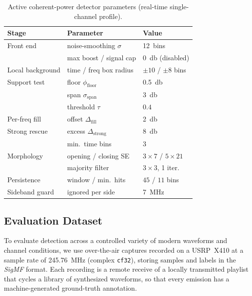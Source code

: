 \begin{table}[t]
\centering
\caption{Active coherent-power detector parameters (real-time single-channel profile).}
\label{tab:params}
\small
\begin{tabular}{@{}lll@{}}
\toprule
Stage & Parameter & Value \\
\midrule
Front end     & noise-smoothing $\sigma$          & \SI{12}{bins} \\
              & max boost / signal cap            & \SI{0}{\decibel} (disabled) \\
Local background & time / freq box radius         & $\pm10$ / $\pm8$ bins \\
Support test  & floor $\phi_{\text{floor}}$       & \SI{0.5}{\decibel} \\
              & span $\sigma_{\text{span}}$       & \SI{3}{\decibel} \\
              & threshold $\tau$                  & $0.4$ \\
Per-freq fill & offset $\Delta_{\text{fill}}$     & \SI{2}{\decibel} \\
Strong rescue & excess $\Delta_{\text{strong}}$   & \SI{8}{\decibel} \\
              & min.\ time bins                   & $3$ \\
Morphology    & opening / closing SE             & $3{\times}7$ / $5{\times}21$ \\
              & majority filter                   & $3{\times}3$, 1 iter. \\
Persistence   & window / min.\ hits              & $45$ / $11$ bins \\
Sideband guard & ignored per side                & \SI{7}{\mega\hertz} \\
\bottomrule
\end{tabular}
\end{table}

\subsection{Evaluation Dataset}
\label{sec:dataset}

To evaluate detection across a controlled variety of modern waveforms and channel
conditions, we use over-the-air captures recorded on a USRP~X410 at a sample rate
of \SI{245.76}{\mega\hertz} (complex \texttt{cf32}), storing samples and labels in
the \emph{SigMF} format. Each recording is a remote receive of a locally
transmitted playlist that cycles a library of synthesized waveforms, so that
every emission has a machine-generated ground-truth annotation.

